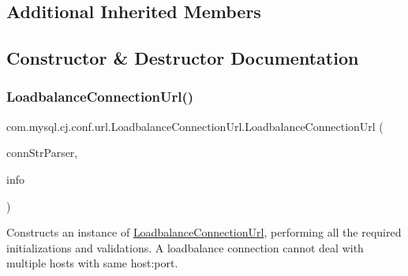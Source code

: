 \subsection*{Additional Inherited Members}


\subsection{Constructor \& Destructor Documentation}
\mbox{\label{classcom_1_1mysql_1_1cj_1_1conf_1_1url_1_1_loadbalance_connection_url_a4605af8a5c29a64ccae2a95c7939aa0e}} 
\subsubsection{\texorpdfstring{Loadbalance\+Connection\+Url()}{LoadbalanceConnectionUrl()}\hspace{0.1cm}{\footnotesize\ttfamily [1/2]}}
{\footnotesize\ttfamily com.\+mysql.\+cj.\+conf.\+url.\+Loadbalance\+Connection\+Url.\+Loadbalance\+Connection\+Url (\begin{DoxyParamCaption}\item[{\mbox{\hyperlink{classcom_1_1mysql_1_1cj_1_1conf_1_1_connection_url_parser}{Connection\+Url\+Parser}}}]{conn\+Str\+Parser,  }\item[{Properties}]{info }\end{DoxyParamCaption})}

Constructs an instance of \mbox{\hyperlink{classcom_1_1mysql_1_1cj_1_1conf_1_1url_1_1_loadbalance_connection_url}{Loadbalance\+Connection\+Url}}, performing all the required initializations and validations. A loadbalance connection cannot deal with multiple hosts with same host\+:port.



